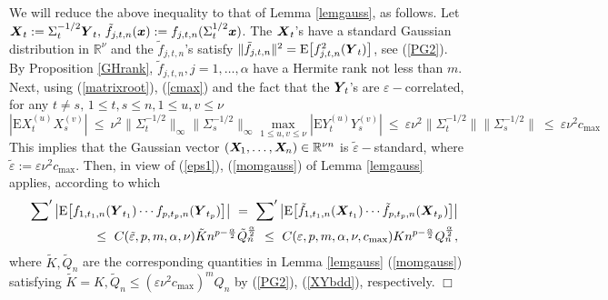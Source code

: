\documentclass[10pt]{article}
\def\R{\mathbb{R}}
\def\E{\mathrm E}
\newcommand{\mbf}[1]{\mbox{\boldmath $#1$}}
\begin{document}
 We will reduce the above inequality to that of Lemma \ref{lemgauss}, as follows. Let
${\mbf X}_t := \Sigma^{-1/2}_t {\mbf Y}_t, \, \tilde f_{j,t,n}({\mbf x}) :=   f_{j,t,n}(\Sigma^{1/2}_t {\mbf x})$. The
${\mbf X}_t$'s have a standard Gaussian distribution in $\R^\nu$
and the $\tilde f_{j,t,n}$'s satisfy $\|\tilde  f_{j,t,n}\|^2
= \E \big[f_{j,t,n}^2({\mbf Y}_t)\big]$, see (\ref{PG2}). By Proposition \ref{GHrank},
$\tilde f_{j,t,n}, j=1, \dots, \alpha $ have a Hermite rank not less than $m$.
Next, using (\ref{matrixroot}), (\ref{cmax})
and the fact that the ${\mbf Y}_{\!t}$'s are $\varepsilon-$correlated, for any
$t\ne s, \, 1 \le t, s \le n, 1\le u, v \le \nu $
\begin{equation}\label{XYbdd}
|\E X^{(u)}_t X^{(v)}_s |\ \le \ \nu^2 \|\Sigma^{-1/2}_t \|_\infty \|\Sigma_s^{-1/2} \|_\infty \max_{1\le u, v \le \nu}
|\E Y^{(u)}_t Y^{(v)}_s | \ \le  \ \varepsilon \nu^2 \|\Sigma^{-1/2}_t \| \|\Sigma_s^{-1/2} \|
\ \le  \  \varepsilon \nu^2 c_{\max}
\end{equation}
This  implies that the Gaussian vector $({\mbf X}_{\!1}, \dots, {\mbf X}_{\!n})\in {\R}^{\nu n}$ is $\tilde \varepsilon-$standard,
where  $ \tilde \varepsilon := \varepsilon \nu^2 c_{\max}$. Then, in view of (\ref{eps1}),
(\ref{momgauss}) of Lemma \ref{lemgauss} applies, according to which
\begin{eqnarray*}
&&\sum\nolimits^\prime \big| \E \big[f_{1,t_1,n}({\mbf Y}_{t_1}) \cdots
f_{p,t_p,n}({\mbf Y}_{t_p})\big] \big|\ =\  \sum\nolimits^\prime \big| \E \big[\tilde f_{1,t_1,n}({\mbf X}_{t_1}) \cdots
\tilde f_{p,t_p,n}({\mbf X}_{t_p})\big] \big| \\
&& \le\  C(\tilde \varepsilon, p, m, \alpha,
\nu )\tilde K n^{p- \frac{\alpha}{2}}\tilde  Q_n^{\frac{\alpha}{2} } \ \le  \
C(\varepsilon, p, m, \alpha,
\nu, c_{\max} ) K n^{p- \frac{\alpha}{2}} Q_n^{\frac{\alpha}{2} },
\end{eqnarray*}
where $\tilde K, \tilde Q_n$ are the corresponding quantities in  Lemma \ref{lemgauss}  (\ref{momgauss}) satisfying
$\tilde K = K, \tilde Q_n \le  (\varepsilon \nu^2 c_{\max})^m Q_n$ by (\ref{PG2}), (\ref{XYbdd}), respectively.
\hfill $\Box$ \\


\end{document}

